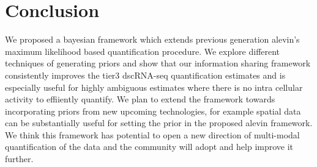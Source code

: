 \section{Conclusion}
We proposed a bayesian framework which extends previous generation alevin's maximum likelihood based 
quantification procedure. We explore different techniques of generating priors and show that our 
information sharing framework consistently improves the tier3 dscRNA-seq quantification estimates and 
is especially useful for highly ambiguous estimates where there is no intra cellular activity to 
effiiently quantify. We plan to extend the framework towards incorporating priors from new upcoming 
technologies, for example spatial data can be substantially useful for setting the prior in the proposed 
alevin framework.  We think this framework has potential to open a new direction of multi-modal 
quantification of the data and the community will adopt and help improve it further.